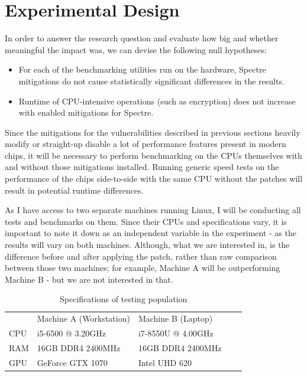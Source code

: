 \documentclass{csfourzero}
\begin{document}
\section{Experimental Design}
\label{sec:exp}
In order to answer the research question and evaluate how big and whether meaningful the impact was, we can devise the following null hypotheses: 
\begin{itemize}
  \item For each of the benchmarking utilities run on the hardware, Spectre mitigations do not cause statistically significant differences in the results.
  \item Runtime of CPU-intensive operations (such as encryption) does not increase with enabled mitigations for Spectre.
\end{itemize}

Since the mitigations for the vulnerabilities described in previous sections heavily modify or straight-up disable a lot of performance features present in modern chips, it will be necessary to perform benchmarking on the CPUs themselves with and without those mitigations installed. Running generic speed tests on the performance of the chips side-to-side with the same CPU without the patches will result in potential runtime differences.

As I have access to two separate machines running Linux, I will be conducting all tests and benchmarks on them. Since their CPUs and specifications vary, it is important to note it down as an independent variable in the experiment - as the results will vary on both machines. Although, what we are interested in, is the difference before and after applying the patch, rather than raw comparison between those two machines; for example, Machine A will be outperforming Machine B - but we are not interested in that.


\begin{table}[h]
\centering
\begin{tabular}{|l|l|l|ll}
\cline{1-3}
    & Machine A (Workstation)         & Machine B (Laptop) &  &  \\ \cline{1-3}
CPU & i5-6500 @ 3.20GHz & i7-8550U @ 4.00GHz       &  &  \\ \cline{1-3}
RAM & 16GB DDR4 2400MHz & 16GB DDR4 2400MHz          &  &  \\ \cline{1-3}
GPU & GeForce GTX 1070  & Intel UHD 620          &  &  \\ \cline{1-3}
\end{tabular}%
\caption{Specifications of testing population}
\label{tab:machines}
\end{table}
\end{document}
